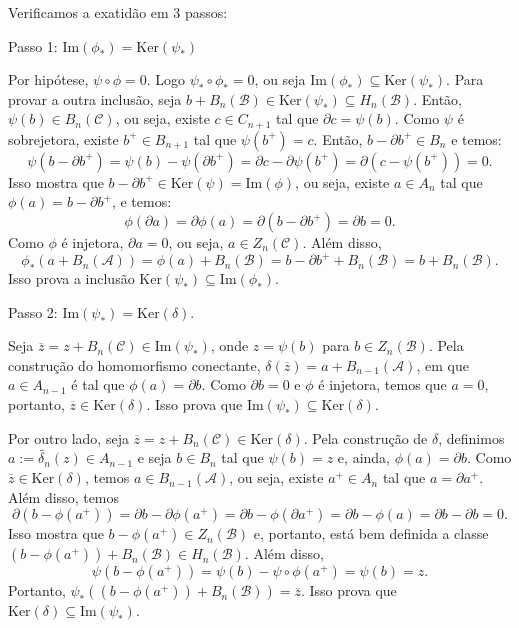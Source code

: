 \begin{dem}
    Verificamos a exatidão em 3 passos:

    Passo 1: $\text{Im}(\phi_*)=\text{Ker}(\psi_*)$

    Por hipótese, $\psi\circ \phi=0$. Logo $\psi_*\circ \phi_*=0$, ou seja $\text{Im}(\phi_*)\subseteq \text{Ker}(\psi_*).$ Para provar a outra inclusão, seja $b+B_n(\mathcal{B})\in \text{Ker} (\psi_*)\subseteq H_n (\mathcal{B})$. Então, $\psi(b)\in B_n(\mathcal{C})$, ou seja, existe $c\in C_{n+1}$ tal que $\partial c=\psi(b)$. Como $\psi$ é sobrejetora, existe $b^+\in B_{n+1}$ tal que $\psi(b^+)=c$. Então, $b-\partial b^+\in B_n$ e temos: 
    \[\psi(b-\partial b^+)=\psi(b)-\psi(\partial b^+)=\partial c-\partial \psi(b^+)=\partial(c-\psi(b^+))=0.\]
    Isso mostra que $b-\partial b^+ \in \text{Ker}(\psi)=\text{Im}(\phi)$, ou seja, existe $a\in A_n$ tal que $\phi(a)=b-\partial b^+$, e temos: 
    \[\phi(\partial a)=\partial\phi (a)=\partial (b-\partial b^+)=\partial b=0.\]
    Como $\phi$ é injetora, $\partial a=0$, ou seja, $a\in Z_n(\mathcal{C})$. Além disso, 
    \[\phi_*(a+B_n(\mathcal{A}))=\phi(a)+B_n(\mathcal{B})=b-\partial b^++B_n(\mathcal{B})=b+B_n(\mathcal{B}).\]
    Isso prova a inclusão $\text{Ker}(\psi_*)\subseteq \text{Im}(\phi_*)$.

    Passo 2: $\text{Im}(\psi_*)=\text{Ker}(\delta).$

    Seja $\overline{z}=z+B_n(\mathcal{C})\in \text{Im}(\psi_*)$, onde $z=\psi(b)$ para $b\in Z_n(\mathcal{B})$. Pela construção do homomorfismo conectante, $\delta(\overline{z})=a+B_{n-1}(\mathcal{A})$, em que $a\in A_{n-1}$ é tal que $\phi(a)=\partial b$. Como $\partial b=0$ e $\phi$ é injetora, temos que $a=0$, portanto, $\overline{z}\in \text{Ker}(\delta)$. Isso prova que $\text{Im}(\psi_*)\subseteq \text{Ker}(\delta)$.
    
    Por outro lado, seja $\overline{z}=z+B_n(\mathcal{C})\in \text{Ker}(\delta)$. Pela construção de $\delta$, definimos $a:=\tilde{\delta_n}(z)\in A_{n-1}$ e seja $b\in B_n$ tal que $\psi(b)=z$ e, ainda, $\phi(a)=\partial b$. Como $\overline{z}\in \text{Ker}(\delta)$, temos $a\in B_{n-1}(\mathcal{A})$, ou seja, existe $a^+\in A_n$ tal que $a=\partial a^+$. Além disso, temos
    \[\partial(b-\phi(a^+))=\partial b-\partial \phi(a^+)=\partial b- \phi(\partial a^+)=\partial b-\phi(a)=\partial b-\partial b=0.\]
    Isso mostra que $b-\phi(a^+)\in Z_n(\mathcal{B})$ e, portanto, está bem definida a classe $(b-\phi(a^+))+B_n(\mathcal{B})\in H_n(\mathcal{B})$. Além disso, 
    \[\psi(b-\phi(a^+))=\psi (b)-\psi\circ\phi(a^+)=\psi(b)=z.\]
    Portanto, $\psi_*((b-\phi(a^+))+B_n(\mathcal{B}))=\overline{z}$. Isso prova que $\text{Ker}(\delta)\subseteq \text{Im}(\psi_*)$.


\end{dem}
